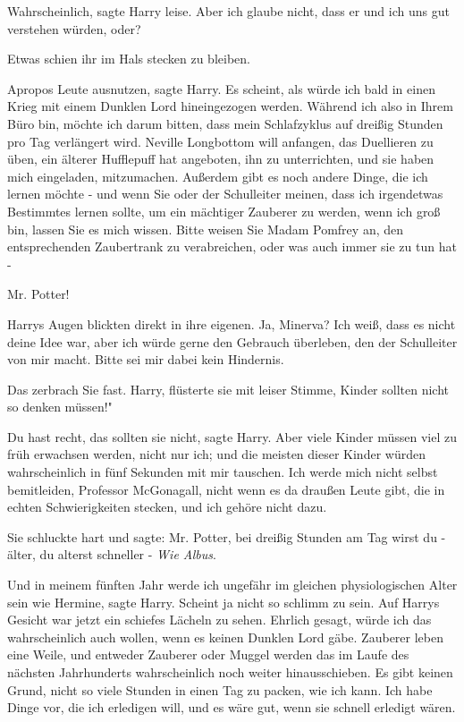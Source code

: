 \glqq{}Wahrscheinlich\grqq{}, sagte Harry leise. \glqq{}Aber ich glaube nicht,
dass er und ich uns gut verstehen würden, oder?\grqq{}

Etwas schien ihr im Hals stecken zu bleiben.

\glqq{}Apropos Leute ausnutzen\grqq{}, sagte Harry. \glqq{}Es scheint, als würde
ich bald in einen Krieg mit einem Dunklen Lord hineingezogen werden. Während ich
also in Ihrem Büro bin, möchte ich darum bitten, dass mein Schlafzyklus auf
dreißig Stunden pro Tag verlängert wird. Neville Longbottom will anfangen, das
Duellieren zu üben, ein älterer Hufflepuff hat angeboten, ihn zu unterrichten,
und sie haben mich eingeladen, mitzumachen. Außerdem gibt es noch andere Dinge,
die ich lernen möchte - und wenn Sie oder der Schulleiter meinen, dass ich
irgendetwas Bestimmtes lernen sollte, um ein mächtiger Zauberer zu werden, wenn
ich groß bin, lassen Sie es mich wissen. Bitte weisen Sie Madam Pomfrey an, den
entsprechenden Zaubertrank zu verabreichen, oder was auch immer sie zu tun hat
-\grqq{}

\glqq{}Mr. Potter!\grqq{}

Harrys Augen blickten direkt in ihre eigenen. \glqq{}Ja, Minerva? Ich weiß, dass
es nicht deine Idee war, aber ich würde gerne den Gebrauch überleben, den der
Schulleiter von mir macht. Bitte sei mir dabei kein Hindernis.\grqq{}

Das zerbrach Sie fast. \glqq{}Harry\grqq{}, flüsterte sie mit leiser Stimme,
\glqq{}Kinder sollten nicht so denken müssen!"

\glqq{}Du hast recht, das sollten sie nicht\grqq{}, sagte Harry. \glqq{}Aber viele
Kinder müssen viel zu früh erwachsen werden, nicht nur ich; und die meisten
dieser Kinder würden wahrscheinlich in fünf Sekunden mit mir tauschen. Ich werde
mich nicht selbst bemitleiden, Professor McGonagall, nicht wenn es da draußen
Leute gibt, die in echten Schwierigkeiten stecken, und ich gehöre nicht
dazu.\grqq{}

Sie schluckte hart und sagte: \glqq{}Mr. Potter, bei dreißig Stunden am Tag wirst
du - älter, du alterst schneller -\grqq{} \emph{Wie Albus}.

\glqq{}Und in meinem fünften Jahr werde ich ungefähr im gleichen physiologischen
Alter sein wie Hermine\grqq{}, sagte Harry. \glqq{}Scheint ja nicht so schlimm zu
sein.\grqq{} Auf Harrys Gesicht war jetzt ein schiefes Lächeln zu sehen. \glqq{}
Ehrlich gesagt, würde ich das wahrscheinlich auch wollen, wenn es keinen Dunklen
Lord gäbe. Zauberer leben eine Weile, und entweder Zauberer oder Muggel werden
das im Laufe des nächsten Jahrhunderts wahrscheinlich noch weiter
hinausschieben. Es gibt keinen Grund, nicht so viele Stunden in einen Tag zu
packen, wie ich kann. Ich habe Dinge vor, die ich erledigen will, und es wäre
gut, wenn sie schnell erledigt wären.\grqq{}

